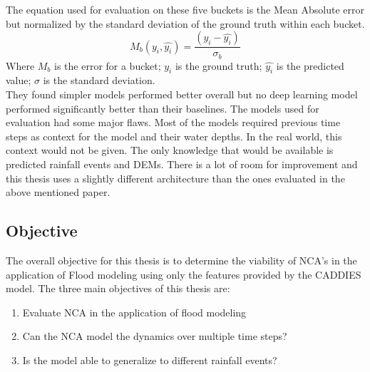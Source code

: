 The equation used for evaluation on these five buckets is the Mean Absolute error but normalized by the standard deviation of the ground truth within each bucket.
\begin{equation}
	M_{b}(y_{i}, \hat{y_{i}}) = \frac{(y_{i} -\hat{y_{i}})}{\sigma{}_{b}}
\end{equation}
Where $M_{b}$ is the error for a bucket; $y_{i}$ is the ground truth; $\hat{y_{i}}$ is the predicted value; $\sigma $ is the standard deviation. \\

They found simpler models performed better overall but no deep learning model performed significantly better than their baselines. The models used for evaluation had some major flaws. Most of the models required previous time steps as context for the model and their water depths. In the real world, this context would not be given. The only knowledge that would be available is predicted rainfall events and DEMs. There is a lot of room for improvement and this thesis uses a slightly different architecture than the ones evaluated in the above mentioned paper.


\subsection{Objective}
The overall objective for this thesis is to determine the viability of NCA's in the application of Flood modeling using only the features provided by the CADDIES model. The three main objectives of this thesis are:

\begin{enumerate}
	\item Evaluate NCA in the application of flood modeling 
	\item Can the NCA model the dynamics over multiple time steps?
	\item Is the model able to generalize to different rainfall events?
\end{enumerate}